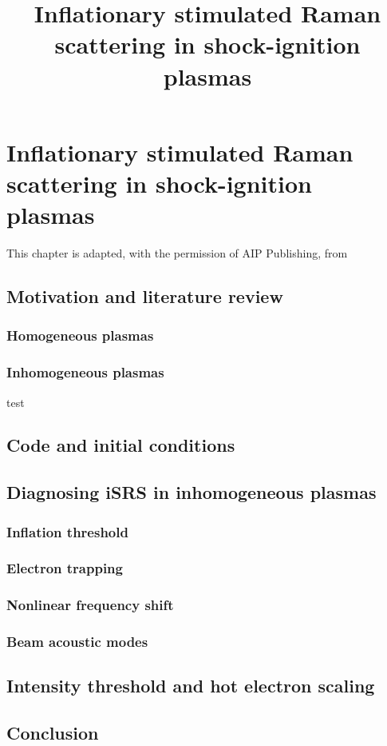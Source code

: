
\chapter{Inflationary stimulated Raman scattering in shock-ignition plasmas}
\label{chp:iSRS}

\nobibliography*

\title{Inflationary stimulated Raman scattering in shock-ignition plasmas}

This chapter is adapted, with the permission of AIP Publishing, from 

\section{Motivation and literature review}
\subsection{Homogeneous plasmas}
\subsection{Inhomogeneous plasmas}
test\cite{Vu2001}


\section{Code and initial conditions}\label{sec:code&IC}

\section{Diagnosing iSRS in inhomogeneous plasmas}\label{sec:signatures}
\subsection{Inflation threshold}
\subsection{Electron trapping}
\subsection{Nonlinear frequency shift}
\subsection{Beam acoustic modes}

\section{Intensity threshold and hot electron scaling}\label{sec:paramScan}

\section{Conclusion}\label{sec:conclusion}


